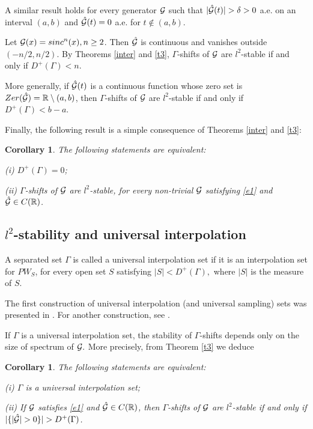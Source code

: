 \documentclass[12pt]{amsart}
\numberwithin{equation}{section}
\newtheorem{corollary}[theorem]{Corollary} \newcommand{\La}{\Lambda}
\newcommand{\R}{{\mathbb R}} \newcommand{\Q}{{\mathbb Q}} \newcommand{\Z}{{\mathbb Z}} \newcommand{\N}{{\mathbb N}}
\newcommand{\Zer}{{\rm Zer}}
\begin{document}
A similar result holds for every generator $\mathcal{G}$  such that 
 $|\hat\Ff(t)|>\delta> 0$ a.e. on an interval $(a,b)$ and $\hat {\mathcal{G}}(t)=0$ a.e. for $t\not\in (a,b)$.
 



\begin{example} Let $\Ff(x)={\rm sinc}^n(x), n\geq2$. Then $\hat{\mathcal{G}}$ is continuous and vanishes outside $(-n/2,n/2)$. By Theorems \ref{inter} and \ref{t3},  $\Gamma$-shifts of $\mathcal{G}$ are $l^2$-stable if and only if $D^+(\Gamma)<n$.  
\end{example}

  
More generally, if   $\hat{\mathcal{G}}(t)$ is a continuous function whose  zero set is $\Zer(\hat{\Ff})= \R\setminus(a,b)$, then  $\Gamma$-shifts of $\mathcal{G}$ are $l^2$-stable if and only if $D^+(\Gamma)<b-a$.
  


Finally, the following  result is a simple consequence of  Theorems \ref{inter} and \ref{t3}:


\begin{corollary}\label{t2} The following statements are equivalent:

{\rm(i)} $D^+(\Gamma)=0${\rm;} 

{\rm(ii)}  $\Gamma$-shifts of $\mathcal{G}$ are  $l^2$-stable, for every non-trivial $\mathcal{G}$ satisfying  \eqref{e1} and $\hat\Ff\in C(\R)$.
\end{corollary} 



\subsection{ \texorpdfstring{$l^2$-stability}{l2} and universal interpolation}


\begin{definition} A separated set
$\Gamma$ is called a universal  interpolation set  if it is an interpolation set for $PW_S$, for every open set $S$  satisfying $|S|< D^+(\Gamma),$ where $|S|$ is the measure of $S.$
\end{definition}

The first construction of universal interpolation (and universal sampling) sets was presented in \cite{MR2439002}.
For another construction, see  \cite{MR2674875}.

If $\Gamma$ is a universal interpolation set, the stability of $\Gamma$-shifts  depends only on the size of spectrum of $\mathcal{G}.$ 
More precisely, from Theorem \ref{t3} we deduce
\begin{corollary}
    The following statements are equivalent:

    {\rm(i)} $\Gamma$ is a universal interpolation set{\rm;}

    {\rm(ii)} If  $\mathcal{G}$  satisfies \eqref{e1} and $\hat\Ff\in C(\R)$, then $\Gamma$-shifts of $\mathcal{G}$ are $l^2$-stable if and only if $|\{|\hat\Ff|>0\}|>D^+(\Gamma)$.
\end{corollary}
\end{document}
